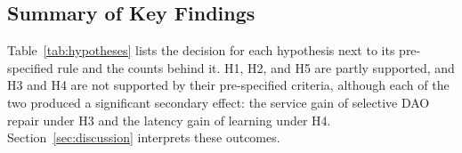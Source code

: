 \begin{table}[t]
\caption{Hypothesis decisions. Evidence counts the conditions in which the effect was significant ($p_H<0.05$) out of those tested, unless noted.}\label{tab:hypotheses}
\centering\footnotesize
\end{table}

\subsection{Summary of Key Findings}
Table~\ref{tab:hypotheses} lists the decision for each hypothesis next to its pre-specified rule and the counts behind it. H1, H2, and H5 are partly supported, and H3 and H4 are not supported by their pre-specified criteria, although each of the two produced a significant secondary effect: the service gain of selective DAO repair under H3 and the latency gain of learning under H4. Section~\ref{sec:discussion} interprets these outcomes.
